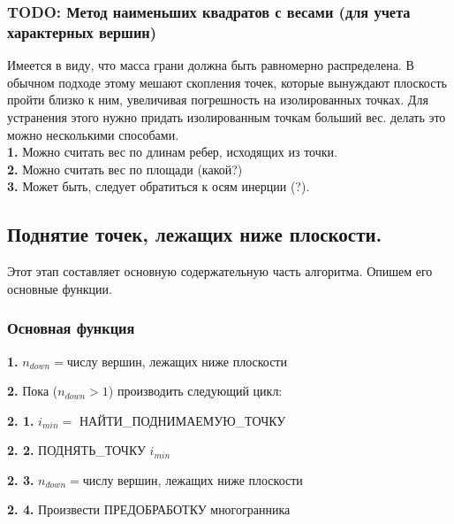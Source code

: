 \documentclass[a4paper,12pt, titlepage]{article}
\begin{document}
\subsubsection{TODO: Метод наименьших квадратов с весами (для учета характерных вершин)}
\begin{flushleft}
Имеется в виду, что масса грани должна быть равномерно распределена. В обычном подходе этому
мешают скопления точек, которые вынуждают плоскость пройти близко к ним, увеличивая погрешность
на изолированных точках. Для устранения этого нужно придать изолированным точкам больший вес.
делать это можно несколькими способами. \\
	\textbf{1. }Можно считать вес по длинам ребер, исходящих из точки.\\
	\textbf{2. }Можно считать вес по площади (какой?)\\
	\textbf{3. }Может быть, следует обратиться к осям инерции (?). 
\end{flushleft}


\subsection{Поднятие точек, лежащих ниже плоскости.}
\begin{flushleft}
 Этот этап составляет основную содержательную часть алгоритма. Опишем его основные функции.
\end{flushleft}

\subsubsection{Основная функция}
\begin{flushleft}
 \textbf{1.} $n_{down} = $числу вершин, лежащих ниже плоскости
\end{flushleft} 
\begin{flushleft}
 \textbf{2.} Пока ($n_{down} > 1$) производить следующий цикл:
\end{flushleft} 
\begin{flushleft}
 \textbf{2. 1.} $i_{min} = $ НАЙТИ\_ПОДНИМАЕМУЮ\_ТОЧКУ
\end{flushleft} 
\begin{flushleft}
 \textbf{2. 2.} ПОДНЯТЬ\_ТОЧКУ $i_{min}$
\end{flushleft} 
\begin{flushleft}
 \textbf{2. 3.} $n_{down} = $числу вершин, лежащих ниже плоскости
\end{flushleft} 
\begin{flushleft}
 \textbf{2. 4.} Произвести ПРЕДОБРАБОТКУ многогранника
\end{flushleft} 
\end{document}
